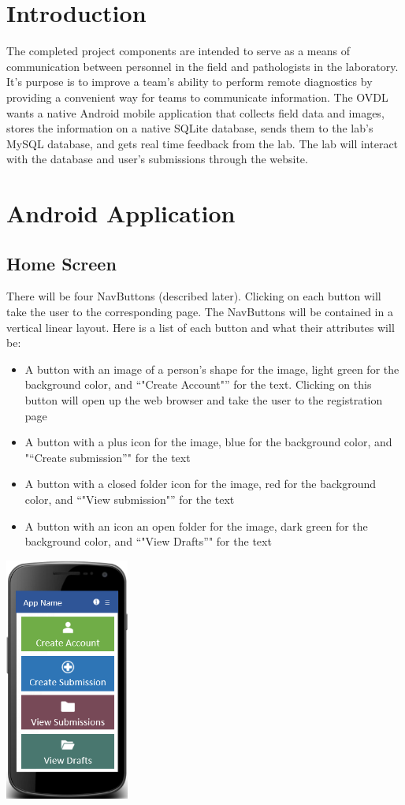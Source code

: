 \documentclass[onecolumn, draftclsnofoot,10pt, compsoc]{IEEEtran}
\begin{document}
\section{Introduction}
The completed project components are intended to serve as a means of communication between personnel in the field and pathologists in the laboratory. It's purpose is to improve a team's ability to perform remote diagnostics by providing a convenient way for teams to communicate information. The OVDL wants a native Android mobile application that collects field data and images, stores the information on a native SQLite database, sends them to the lab's MySQL database, and gets real time feedback from the lab. The lab will interact with the database and user's submissions through the website.

\section{Android Application}
\subsection{Home Screen}
There will be four NavButtons (described later). Clicking on each button will take the user to the corresponding page. The NavButtons will be contained in a vertical linear layout. Here is a list of each button and what their attributes will be:
\begin{itemize}
\item A button with an image of a person’s shape for the image, light green for the background color, and “"Create Account"” for the text. Clicking on this button will open up the web browser and take the user to the registration page
\item A button with a plus icon for the image, blue for the background color, and "“Create submission”" for the text
\item A button with a closed folder icon for the image, red for the background color, and “"View submission"” for the text
\item A button with an icon an open folder for the image, dark green for the background color, and “"View Drafts”" for the text
\end{itemize}

\begin{center}
\includegraphics[height=8cm]{homescreen.png}
\end{center}
\end{document}
